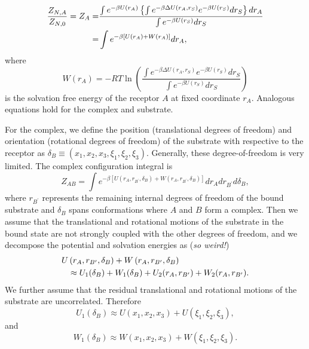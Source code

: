\begin{align}
	\frac{Z_{N,A}}{Z_{N,0}}=Z_A=&\frac{\int e^{-\beta U(r_A)}\left\{\int e^{-\beta\Delta U(r_A,r_S)}e^{-\beta U(r_S)}dr_S\right\}dr_A}{\int e^{-\beta U(r_S)}dr_S}\notag\\
	                           =&\int e^{-\beta \left[U(r_A)+W(r_A)\right]}dr_A,
\end{align}
where
\begin{equation}
	W(r_A)=-RT\ln{\left(\frac{\int e^{-\beta\Delta U(r_A,r_S)}e^{-\beta U(r_S)}dr_S}{\int e^{-\beta U(r_S)}dr_S}\right)}
\end{equation}
is the solvation free energy of the receptor $A$ at fixed coordinate $r_A$. Analogous equations hold for the complex and substrate.

For the complex, we define the position (translational degrees of freedom) and orientation (rotational degrees of freedom) of the substrate with respective to the receptor as $\delta_B\equiv\left(x_1,x_2,x_3,\xi_1,\xi_2,\xi_3\right)$. Generally, these degree-of-freedom is very limited. The complex configuration integral is 
\begin{equation}
	Z_{AB}=\int e^{-\beta\left[U\left(r_A,r_{B^\prime},\delta_B\right)+W\left(r_A,r_{B^\prime},\delta_B\right)\right]}dr_Adr_{B^\prime}d\delta_B,
\end{equation}
where $r_{B^\prime}$ represents the remaining internal degrees of freedom of the bound substrate and $\delta_B$ spans conformations where $A$ and $B$ form a complex. 
Then we assume that the translational and rotational motions of the substrate in the bound state are not strongly coupled with the other degrees of freedom, and we decompose the potential and solvation energies as (\textit{so weird!})
\begin{align}
	U&\left(r_A,r_{B^\prime},\delta_B\right)+W\left(r_A,r_{B^\prime},\delta_B\right)\notag\\
	 &\approx U_1(\delta_B) + W_1(\delta_B) +U_2(r_A,r_{B^\prime})+W_2(r_A,r_{B^\prime}).
\end{align}
We further assume that the residual translational and rotational motions of the substrate are uncorrelated. Therefore
\begin{equation}
	U_1(\delta_B) \approx U(x_1,x_2,x_3) + U(\xi_1,\xi_2,\xi_3),
\end{equation}
and
\begin{equation}
	W_1(\delta_B) \approx W(x_1,x_2,x_3) + W(\xi_1,\xi_2,\xi_3).
\end{equation}

